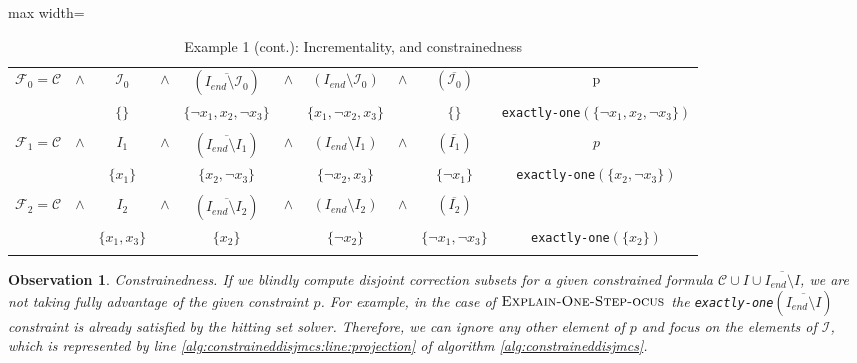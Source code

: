 \documentclass[twoside,11pt]{article}
\newcommand\m[1]{\mathcal{#1}}
\newtheorem{observation}[obs]{Observation}
\newcommand\Iend{\ensuremath{I_\mathit{end} }\xspace}
\newcommand\formula{\ensuremath{\m{F} }\xspace}
\newcommand\formulac{\ensuremath{\m{C} }\xspace}
\newcommand\mm[1]{\ensuremath{#1}\xspace}
\newcommand\call[1]{\mm{\textsc{#1}}}
\newcommand\onestepo{\ensuremath{\call{Explain-One-Step-ocus}} \xspace}
\begin{document}
\begin{table}
\centering
\begin{adjustbox}{max width=\columnwidth}
	\begin{tabular}{ccccccccc|c}
		$\formula_0 = \m{C}$ & $  \wedge$ & $  \m{I}_0 $ &  $\wedge $ & $(\overline{\Iend\setminus \m{I}_0})$ &   $\wedge $ & $(\Iend\setminus \m{I}_0) $ & $\wedge $ & $(\overline{\m{I}_0})$ & p\\ 
		 &  &  $ \{\}$ &  & $ \{  \lnot x_1, x_2, \lnot x_3\}$ &  & $ \{x_1,  \lnot x_2, x_3\}$ &  & $ \{ \}$ & \texttt{exactly-one}$(\{\lnot x_1, x_2, \lnot x_3\})$\\ \\
		$\formula_1 = \m{C}  $ & $\wedge$ & $  I_1 $        & $\wedge $ & $(\overline{\Iend\setminus I_1})$ & $\wedge $ & $(\Iend\setminus I_1) $ & $\wedge $ & $(\overline{I_1})$          & $p$                                         \\ 
							   &          & $ \{ x_1\}$     &           & $ \{ x_2, \lnot x_3\}$            &           & $ \{ \lnot x_2, x_3\}$  &           & $ \{ \lnot x_1\}$           & \texttt{exactly-one}$(\{ x_2, \lnot x_3\})$ \\ \\
		$\formula_2 = \m{C} $&$\wedge$ & $  I_2 $ &  $\wedge $ & $(\overline{\Iend\setminus I_2})$ &   $\wedge $ & $(\Iend\setminus I_2) $ & $\wedge $ & $(\overline{I_2})$ \\ 
							   &          & $\{ x_1 ,x_3\}$ &           & $\{ x_2\}$                        &           & $\{ \lnot x_2\}$        &           & $\{ \lnot x_1, \lnot x_3\}$ & \texttt{exactly-one}$(\{ x_2\})$            \\ \\
	\end{tabular} 
\end{adjustbox}
\caption{Example 1 (cont.): Incrementality, and constrainedness}
\end{table}

\begin{observation}
\emph{Constrainedness.} If we blindly compute disjoint correction subsets for a given constrained formula $\formulac \cup I\cup \overline{\Iend\setminus I}$, we are not taking fully advantage of the given constraint \emph{$p$}. For example, in the case of \onestepo the \texttt{exactly-one}$(\overline{\Iend\setminus I})$ constraint is already satisfied by the hitting set solver. Therefore, we can ignore any other element of \emph{$p$} and focus on the elements of $\m{I}$, which is represented by line \ref{alg:constraineddisjmcs:line:projection} of algorithm \ref{alg:constraineddisjmcs}. 
\end{observation}
\end{document}
